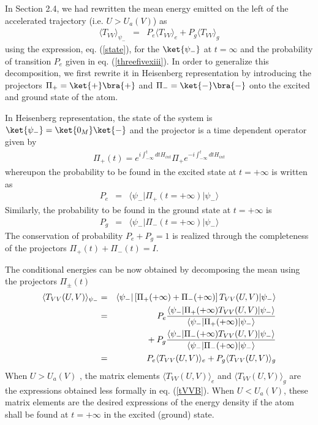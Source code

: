 \documentclass[12pt]{article}
\begin{document}
In Section 2.4, we had rewritten the mean energy
emitted on the left of the accelerated trajectory (i.e. $U>U_a(V)$)
as
\begin{eqnarray} \langle T_{VV}
\rangle_{\psi_-} &=&
P_e \langle T_{VV}
\rangle_e + P_g \langle T_{VV} \rangle_g
\label{ooo}
\end{eqnarray}
using the expression, eq. (\ref{state}),
 for the $\ket{\psi_-}$ at $t=\infty$ and the probability of
transition $P_e$ given in eq. (\ref{threefivexiii}).
In order to generalize this
decomposition, we first rewrite it in Heisenberg
representation by introducing the projectors $\Pi_+ =
\ket{+}\bra{+}$ and  $\Pi_- = \ket{-}\bra{-}$ onto the
excited and ground state of the atom.

In Heisenberg representation, the state of the system is
$\ket{\psi_-}=\ket{0_M} \ket{-}$ and the projector is a time dependent operator
given by
\begin{eqnarray}
\Pi_+(t) = e^{i\int^t_{-\infty} dt H_{int}} \Pi_+ e^{-i\int^t_{-\infty} dt
H_{int}}
\label{Pidet}
\end{eqnarray}
whereupon the probability to be found in the
excited
state at $t=+\infty$ is written as
\begin{eqnarray}
P_e
&=&\langle \psi_- \vert
\Pi_+(t=+\infty)   \vert \psi_-\rangle \label{ootwo}
\end{eqnarray}
Similarly, the probability to
be found in the ground state at $t=+ \infty$ is
\begin{eqnarray} P_g &=& \langle
\psi_- \vert  \Pi_-(t=+\infty)   \vert \psi_-\rangle
\label{oothree} \end{eqnarray} The conservation of
probability $P_e+P_g=1$ is realized through the
completeness of the projectors $\Pi_+(t)+ \Pi_-(t) = I$.

The conditional energies can be now obtained by decomposing
the mean using the projectors $\Pi_\pm(t)$
\begin{eqnarray}
\langle T_{VV}(U,V) \rangle_{\psi_-}
 &=& \langle \psi_- \vert \left[ \Pi_+ (+\infty) + \Pi_- (+\infty)\right]
T_{VV}(U,V)
\vert \psi_-\rangle\nonumber\\ &=& P_e { \langle \psi_-
\vert \Pi_+ (+\infty) T_{VV}(U,V) \vert \psi_-\rangle \over \langle
\psi_- \vert \Pi_+ (+\infty) \vert \psi_-\rangle }\\
&& \quad {} + 
P_g { \langle \psi_- \vert \Pi_- (+\infty) T_{VV}(U,V) \vert
\psi_-\rangle \over \langle \psi_- \vert \Pi_- (+\infty) \vert
\psi_-\rangle }\nonumber\\ &=&  P_e \langle
T_{VV}(U,V)\rangle_e + P_g \langle  T_{VV}(U,V)\rangle_g
\label{oofour}
\end{eqnarray}
When $U>U_a(V)$ , the matrix
elements  $\langle  T_{VV}(U,V)\rangle_e$ and $\langle
T_{VV}(U,V)\rangle_g$ are the expressions obtained less
formally in eq. (\ref{tVVB}).
When
$U<U_a(V)$, these matrix elements are the desired
expressions of the energy density if the atom shall be
found at $t=+\infty$ in the excited (ground) state.
\end{document}
